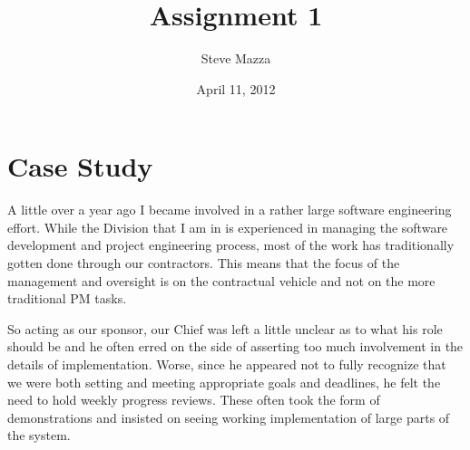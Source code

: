 \documentclass[letterpaper,12pt]{article}
\title{Assignment 1}
\author{Steve Mazza}
\date{April 11, 2012}
\begin{document}
\maketitle

\section{Case Study}


A little over a year ago I became involved in a rather large software engineering effort.  While the Division that I am in is experienced in managing the software development and project engineering process, most of the work has traditionally gotten done through our contractors.  This means that the focus of the management and oversight is on the contractual vehicle and not on the more traditional PM tasks.  

So acting as our sponsor, our Chief was left a little unclear as to what his role should be and he often erred on the side of asserting too much involvement in the details of implementation.  Worse, since he appeared not to fully recognize that we were both setting and meeting appropriate goals and deadlines, he felt the need to hold weekly progress reviews.  These often took the form of demonstrations and insisted on seeing working implementation of large parts of the system.
\end{document}
